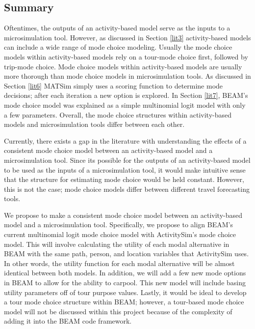 \documentclass[3p, authoryear, review]{elsarticle} %
\begin{document}
\hypertarget{lit9}{%
\subsection{Summary}\label{lit9}}

Oftentimes, the outputs of an activity-based model serve as the inputs to a microsimulation tool. However, as discussed in Section \ref{lit3} activity-based models can include a wide range of mode choice modeling. Usually the mode choice models within activity-based models rely on a tour-mode choice first, followed by trip-mode choice. Mode choice models within activity-based models are usually more thorough than mode choice models in microsimulation tools. As discussed in Section \ref{lit6} MATSim simply uses a scoring function to determine mode decisions; after each iteration a new option is explored. In Section \ref{lit7}, BEAM's mode choice model was explained as a simple multinomial logit model with only a few parameters. Overall, the mode choice structures within activity-based models and microsimulation tools differ between each other.

Currently, there exists a gap in the literature with understanding the effects of a consistent mode choice model between an activity-based model and a microsimulation tool. Since its possible for the outputs of an activity-based model to be used as the inputs of a microsimulation tool, it would make intuitive sense that the structure for estimating mode choice would be held constant. However, this is not the case; mode choice models differ between different travel forecasting tools.

We propose to make a consistent mode choice model between an activity-based model and a microsimulation tool. Specifically, we propose to align BEAM's current multinomial logit mode choice model with ActivitySim's mode choice model. This will involve calculating the utility of each modal alternative in BEAM with the same path, person, and location variables that ActivitySim uses. In other words, the utility function for each modal alternative will be almost identical between both models. In addition, we will add a few new mode options in BEAM to allow for the ability to carpool. This new model will include basing utility parameters off of tour purpose values. Lastly, it would be ideal to develop a tour mode choice structure within BEAM; however, a tour-based mode choice model will not be discussed within this project because of the complexity of adding it into the BEAM code framework.
\end{document}
